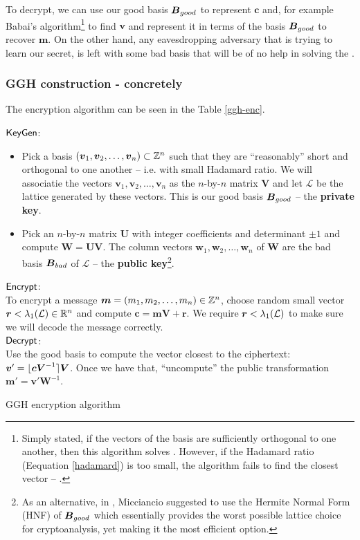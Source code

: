 To decrypt, we can use our good basis $\boldsymbol{B}_{good}$ to represent $\bm{c}$ and, for example Babai's algorithm\footnote{Simply stated, if the vectors of the basis are sufficiently orthogonal to one another, then this algorithm solves . However, if the Hadamard ratio (Eequation \ref{hadamard}) is too small, the algorithm fails to find the closest vector -- \cite{book}.} to find $\bm{v}$ and represent it in terms of the basis $\boldsymbol{B}_{good}$ to recover $\bm{m}$. On the other hand, any eavesdropping adversary that is trying to learn our secret, is left with some bad basis that will be of no help in solving the .

\subsubsection*{GGH construction - concretely}
The encryption algorithm can be seen in the Table \ref{ggh-enc}.
\begin{table}[ht]
	\centering
	\begin{mdframed}
$\textsf{KeyGen}$:
\begin{itemize}
    \item Pick a basis $(\boldsymbol{v}_1, \boldsymbol{v}_2, \dots, \boldsymbol{v}_n) \subset \mathbb{Z}^n$ such that they are ``reasonably'' short and orthogonal to one another -- i.e. with small Hadamard ratio. We will associatie the vectors $\bm{v}_1, \bm{v}_2, \dots, \bm{v}_n$ as the $n$-by-$n$ matrix $\bm{V}$ and let $\mathcal{L}$ be the lattice generated by these vectors. This is our good basis $\boldsymbol{B}_{good}$ -- the \textbf{private key}.
    \item Pick an $n$-by-$n$ matrix $\bm{U}$ with integer coefficients and determinant $\pm 1$ and compute $\bm{W} = \bm{UV}$. The column vectors $\bm{w}_1, \bm{w}_2, \dots, \bm{w}_n$ of $\bm{W}$ are the bad basis $\boldsymbol{B}_{bad}$ of $\mathcal{L}$ -- the \textbf{public key}\footnote{As an alternative, in \cite{hnf}, Micciancio suggested to use the Hermite Normal Form (HNF) of $\boldsymbol{B}_{good}$ which essentially provides the worst possible lattice choice for cryptoanalysis, yet making it the most efficient option.}.
\end{itemize}
$\textsf{Encrypt}$:\\
To encrypt a message $\boldsymbol{m} = (m_1, m_2, \dots, m_n) \in \mathbb{Z}^n$, choose random small vector $\boldsymbol{r} < \lambda_1(\mathcal{L}) \in \mathbb{R}^n$  and compute $\bm{c} = \bm{mV} + \bm{r}$. We require $\boldsymbol{r} < \lambda_1(\mathcal{L})$ to make sure we will decode the message correctly.\\
$\textsf{Decrypt}$:\\
Use the good basis to compute the vector closest to the ciphertext: $\boldsymbol{v}' = \lfloor \boldsymbol{cV}^{-1} \rceil\boldsymbol{V}$. Once we have that, ``uncompute'' the public transformation $\bm{m}' = \bm{v}'\bm{W}^{-1}$.
\end{mdframed}
\caption{GGH encryption algorithm}
\label{ggh-enc}
\end{table}



